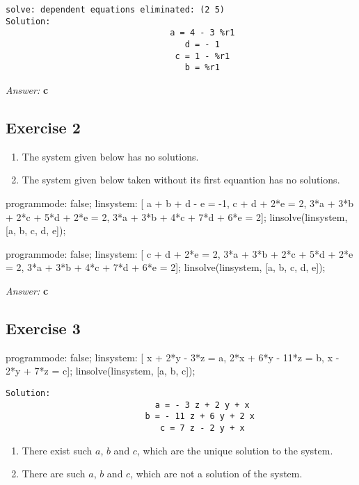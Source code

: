 \documentclass[11pt]{article}
\begin{document}
\begin{verbatim}
solve: dependent equations eliminated: (2 5)
Solution:
                                 a = 4 - 3 %r1
                                    d = - 1
                                  c = 1 - %r1
                                    b = %r1
\end{verbatim}

\emph{Answer:} \textbf{c}
\subsection{Exercise 2}
\label{sec-2-2}
\begin{enumerate}
\item The system given below has no solutions.
\item The system given below taken without its first equantion has no solutions.
\end{enumerate}

\begin{maxima}
programmode: false;
linsystem: [  a +   b +         d -   e = -1,
                          c +   d + 2*e = 2,
            3*a + 3*b + 2*c + 5*d + 2*e = 2,
            3*a + 3*b + 4*c + 7*d + 6*e = 2];
linsolve(linsystem, [a, b, c, d, e]);
\end{maxima}

\begin{maxima}
programmode: false;
linsystem: [              c +   d + 2*e = 2,
            3*a + 3*b + 2*c + 5*d + 2*e = 2,
            3*a + 3*b + 4*c + 7*d + 6*e = 2];
linsolve(linsystem, [a, b, c, d, e]);
\end{maxima}

\emph{Answer:} \textbf{c}
\subsection{Exercise 3}
\label{sec-2-3}

\begin{maxima}
programmode: false;
linsystem: [  x + 2*y -  3*z = a,
            2*x + 6*y - 11*z = b,
              x - 2*y +  7*z = c];
linsolve(linsystem, [a, b, c]);
\end{maxima}

\begin{verbatim}
Solution:
                              a = - 3 z + 2 y + x
                            b = - 11 z + 6 y + 2 x
                               c = 7 z - 2 y + x
\end{verbatim}


\begin{enumerate}
\item There exist such $a$, $b$ and $c$, which are the unique solution to
the system.
\item There are such $a$, $b$ and $c$, which are not a solution of the system.
\end{enumerate}
\end{document}
